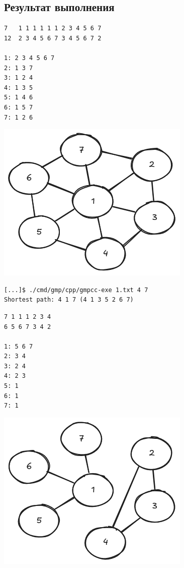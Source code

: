 \documentclass[12pt, a4paper]{article}
\begin{document}
\subsection{Результат выполнения}

\vspace{5mm}

\begin{multicols}{2}
\begin{verbatim}
7   1 1 1 1 1 1 2 3 4 5 6 7
12  2 3 4 5 6 7 3 4 5 6 7 2

1: 2 3 4 5 6 7 
2: 1 3 7 
3: 1 2 4 
4: 1 3 5 
5: 1 4 6 
6: 1 5 7 
7: 1 2 6
\end{verbatim}

\columnbreak

\includegraphics[scale=0.5]{1.png}
\end{multicols}

\begin{verbatim}
[...]$ ./cmd/gmp/cpp/gmpcc-exe 1.txt 4 7
Shortest path: 4 1 7 (4 1 3 5 2 6 7)
\end{verbatim}

\vspace{5mm}

\begin{multicols}{2}
\begin{verbatim}
7 1 1 1 2 3 4
6 5 6 7 3 4 2

1: 5 6 7
2: 3 4
3: 2 4
4: 2 3
5: 1
6: 1
7: 1
\end{verbatim}

\columnbreak

\includegraphics[scale=0.5]{2.png}
\end{multicols}
\end{document}

